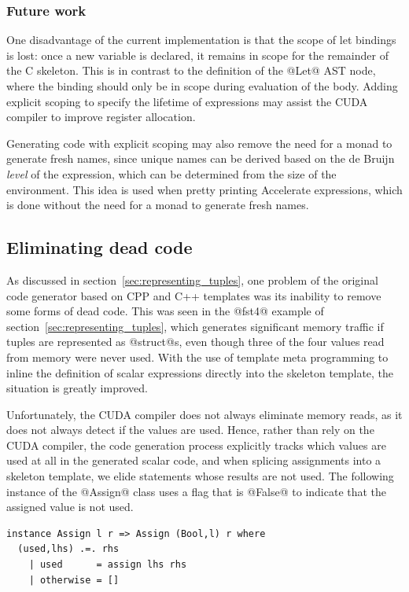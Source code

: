 \subsubsection{Future work}

One disadvantage of the current implementation is that the scope of let bindings
is lost: once a new variable is declared, it remains in scope for the remainder
of the C skeleton. This is in contrast to the definition of the @Let@ AST
node, where the binding should only be in scope during evaluation of the body.
Adding explicit scoping to specify the lifetime of expressions may assist the
CUDA compiler to improve register allocation.


Generating code with explicit scoping may also remove the need for a monad to
generate fresh names, since unique names can be derived based on the de Bruijn
\emph{level} of the expression, which can be determined from the size of the
environment. This idea is used when pretty printing Accelerate expressions,
which is done without the need for a monad to generate fresh names.


\subsection{Eliminating dead code}
\label{sec:eliminating_dead_code}

As discussed in section~\ref{sec:representing_tuples}, one problem of the
original code generator based on CPP and C++ templates was its inability to
remove some forms of dead code. This was seen in the @fst4@ example of
section~\ref{sec:representing_tuples}, which generates significant memory
traffic if tuples are represented as @struct@s, even though three of the
four values read from memory were never used. With the use of template meta
programming to inline the definition of scalar expressions directly into the
skeleton template, the situation is greatly improved.

Unfortunately, the CUDA compiler does not always eliminate memory reads, as it
does not always detect if the values are used. Hence, rather than rely on the
CUDA compiler, the code generation process explicitly tracks which values are
used at all in the generated scalar code, and when splicing assignments into a
skeleton template, we elide statements whose results are not used. The following
instance of the @Assign@ class uses a flag that is @False@ to indicate
that the assigned value is not used.
%
\begin{lstlisting}[style=haskell]
instance Assign l r => Assign (Bool,l) r where
  (used,lhs) .=. rhs
    | used      = assign lhs rhs
    | otherwise = []
\end{lstlisting}

